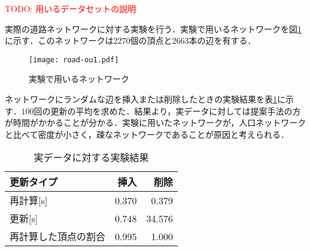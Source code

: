 \textcolor{red}{TODO: 用いるデータセットの説明}

実際の道路ネットワークに対する実験を行う．実験で用いるネットワークを図\ref{fig:net-ou1}に示す．このネットワークは2270個の頂点と2663本の辺を有する．
\begin{figure}[tb]
  \centering
  \texttt{[image: road-ou1.pdf]}
  \caption{実験で用いるネットワーク}
  \label{fig:net-ou1}
\end{figure}

ネットワークにランダムな辺を挿入または削除したときの実験結果を表\ref{tab:res-ou1}に示す．$100$回の更新の平均を求めた．結果より，実データに対しては提案手法の方が時間がかかることが分かる．実験に用いたネットワークが，人口ネットワークと比べて密度が小さく，疎なネットワークであることが原因と考えられる．

\begin{table}[tb]
  \centering
  \caption{実データに対する実験結果}
  \label{tab:res-ou1}
  \begin{tabular}{lrr}
    \hline\hline
    更新タイプ & 挿入 & 削除 \\ \hline\hline
    再計算[s] & 0.370 & 0.379 \\ \hline
    更新[s] & 0.748 & 34.576 \\ \hline\hline
    再計算した頂点の割合 & 0.995 & 1.000 \\ \hline\hline
  \end{tabular}
\end{table}
